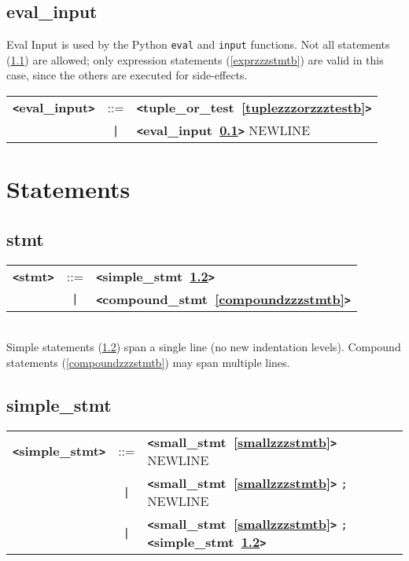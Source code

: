 \documentclass[12pt]{article}
\begin{document}
\subsection{eval\_input}
\label{evalzzzinputb}
Eval Input is used by the Python \verb+eval+ and \verb+input+ functions.  Not all statements (\ref{stmtb}) are allowed; only expression statements (\ref{exprzzzstmtb}) are valid in this case, since the others are executed for side-effects. \\

\begin{tabular}{lcl}
{\bf \verb+<+eval\_input\verb+>+} & ::=  & {\bf \verb+<+tuple\_or\_test~\ref{tuplezzzorzzztestb}\verb+>+}  \\
 & \verb+|+  & {\bf \verb+<+eval\_input~\ref{evalzzzinputb}\verb+>+}  NEWLINE \\
\end{tabular}

\section{Statements}

\subsection{stmt}
\label{stmtb}
\begin{tabular}{lcl}
{\bf \verb+<+stmt\verb+>+} & ::=  & {\bf \verb+<+simple\_stmt~\ref{simplezzzstmtb}\verb+>+}  \\
 & \verb+|+  & {\bf \verb+<+compound\_stmt~\ref{compoundzzzstmtb}\verb+>+}  \\
\end{tabular} \\

Simple statements (\ref{simplezzzstmtb}) span a single line (no new indentation levels).  Compound statements (\ref{compoundzzzstmtb}) may span multiple lines. \\

\subsection{simple\_stmt}
\label{simplezzzstmtb}
\begin{tabular}{lcl}
{\bf \verb+<+simple\_stmt\verb+>+} & ::=  & {\bf \verb+<+small\_stmt~\ref{smallzzzstmtb}\verb+>+}  NEWLINE \\
 & \verb+|+  & {\bf \verb+<+small\_stmt~\ref{smallzzzstmtb}\verb+>+}  \verb|;| NEWLINE \\
 & \verb+|+  & {\bf \verb+<+small\_stmt~\ref{smallzzzstmtb}\verb+>+}  \verb|;| {\bf \verb+<+simple\_stmt~\ref{simplezzzstmtb}\verb+>+}  \\
\end{tabular}
\end{document}
